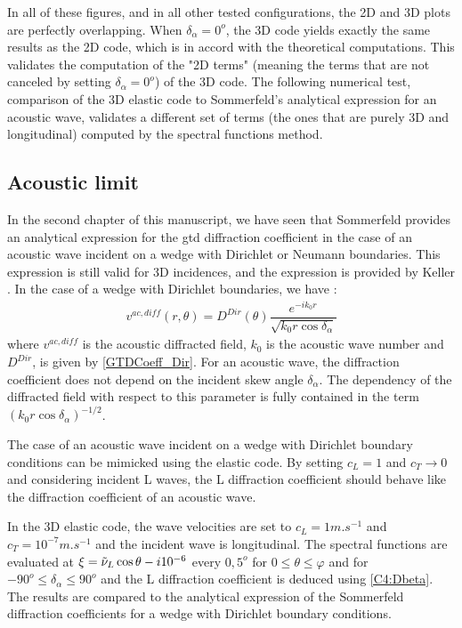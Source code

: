 In all of these figures, and in all other tested configurations, the 2D and 3D plots are perfectly overlapping. When $\delta_{\alpha}=0^o$, the 3D code yields exactly the same results as the 2D code, which is in accord with the theoretical computations. This validates the computation of the "2D terms" (meaning the terms that are not canceled by setting $\delta_{\alpha}=0^o$) of the 3D code. The following numerical test, comparison of the 3D elastic code to Sommerfeld's analytical expression for an acoustic wave, validates a different set of terms (the ones that are purely 3D and longitudinal) computed by the spectral functions method.

\subsection{Acoustic limit}
In the second chapter of this manuscript, we have seen that Sommerfeld \cite{Sommerfeld} provides an analytical expression for the \acrshort{gtd} diffraction coefficient in the case of an acoustic wave incident on a wedge with Dirichlet or Neumann boundaries. This expression is still valid for 3D incidences, and the expression is provided by Keller \cite{GTD}. In the case of a wedge with Dirichlet boundaries, we have :
\begin{equation}
\begin{split}
v^{ac,diff}(r,\theta)=D^{Dir}(\theta)\dfrac{e^{-ik_0r}}{\sqrt{k_0r\cos\delta_{\alpha}}}
\end{split}
\end{equation}
where $v^{ac,diff}$ is the acoustic diffracted field, $k_0$ is the acoustic wave number and $D^{Dir}$, is given by \eqref{GTDCoeff_Dir}. For an acoustic wave, the diffraction coefficient does not depend on the incident skew angle $\delta_{\alpha}$. The dependency of the diffracted field with respect to this parameter is fully contained in the term $(k_0r\cos\delta_{\alpha})^{-1/2}$.

The case of an acoustic wave incident on a wedge with Dirichlet boundary conditions can be mimicked using the elastic code. By setting $c_L=1$ and $c_T \rightarrow 0$ and considering incident L waves, the L diffraction coefficient should behave like the diffraction coefficient of an acoustic wave. 

In the 3D elastic code, the wave velocities are set to $c_L=1 m.s^{-1}$ and $c_T=10^{-7} m.s^{-1}$ and the incident wave is longitudinal. The spectral functions are evaluated at $\xi=\tilde{\nu}_L\cos\theta -i10^{-6}$ every $0,5^o$ for $0\leq\theta\leq \varphi$ and for $-90^o\leq \delta_{\alpha} \leq 90^o$ and the L diffraction coefficient is deduced using \eqref{C4:Dbeta}. The results are compared to the analytical expression of the Sommerfeld diffraction coefficients for a wedge with Dirichlet boundary conditions.

